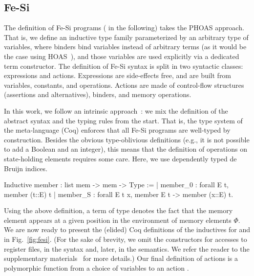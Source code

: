 \documentclass{llncs}
\begin{document}
\subsection{Fe-Si}
The definition of Fe-Si programs ( in the following)
takes the PHOAS approach. 
%
That is, we define an inductive type family parameterized by an
arbitrary type  of variables, where binders bind variables
instead of arbitrary terms (as it would be the case using
HOAS~\cite{DBLP:conf/pldi/PfenningE88}), and those variables are used
explicitly via a dedicated term constructor.
%
The definition of Fe-Si syntax is split in two syntactic classes:
expressions and actions. 
%
Expressions are side-effects free, and are built from variables,
constants, and operations.
%
Actions are made of control-flow structures (assertions and
alternatives), binders, and memory operations. 

In this work, we follow an intrinsic
approach~\cite{DBLP:journals/jar/BentonHKM12}: we mix the definition
of the abstract syntax and the typing rules from the start. That is,
the type system of the meta-language (Coq) enforces that all Fe-Si
programs are well-typed by construction.
%
Besides the obvious type-oblivious definitions (e.g., it is not
possible to add a Boolean and an integer), this means that the
definition of operations on state-holding elements requires some care.
%
Here, we use dependently typed de Bruijn indices. 
\begin{mcoq}
Inductive member : list mem -> mem ->  Type :=
| member_0 : forall E t, member (t::E) t
| member_S : forall E t x, member E t -> member (x::E) t.
\end{mcoq}
Using the above definition, a term of type  denotes
the fact that the memory element  appears at a given position
in the environment of memory elements $\Phi$. 
%
We are now ready to present the (elided) Coq definitions of the
inductives for  and  in Fig.~\ref{fig:fesi}.
%
(For the sake of brevity, we omit the constructors for accesses to
register files, in the syntax and, later, in the semantics. We refer
the reader to the supplementary materials~\cite{fesi} for more details.)
%
Our final definition  of actions is a polymorphic
function from a choice of variables to an action .
\end{document}
